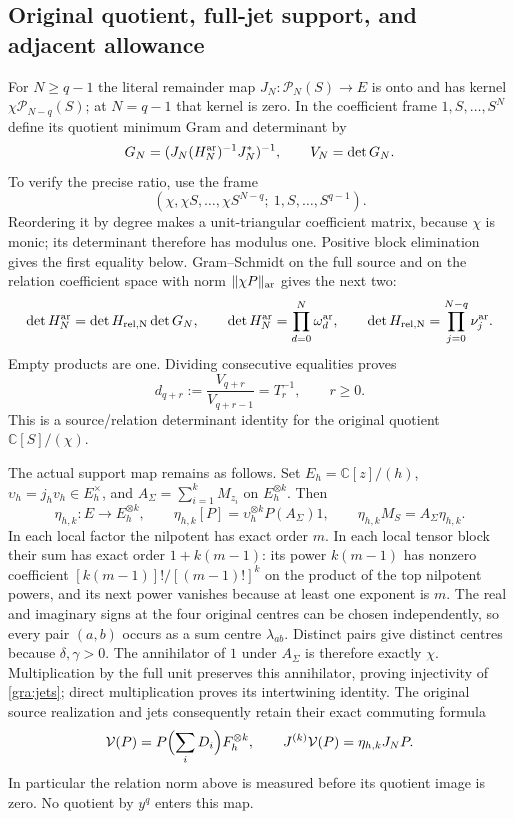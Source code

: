 \documentclass[11pt,a4paper]{article}
\begin{document}
\subsection{Original quotient, full-jet support, and adjacent allowance}

For $N\ge q-1$ the literal remainder map $J_N:\mathcal P_N(S)\to E$
is onto and has kernel $\chi\mathcal P_{N-q}(S)$; at $N=q-1$ that kernel
is zero.  In the coefficient frame $1,S,\ldots,S^N$ define its quotient
minimum Gram and determinant by
\[
 G_N=(J_N(H_N^{\rm ar})^{-1}J_N^*)^{-1},\qquad V_N=\det G_N.
\]
To verify the precise ratio, use the frame
\[
 (\chi,\chi S,\ldots,\chi S^{N-q};\ 1,S,\ldots,S^{q-1}).
\]
Reordering it by degree makes a unit-triangular coefficient matrix,
because $\chi$ is monic; its determinant therefore has modulus one.
Positive block elimination gives the first equality below.
Gram--Schmidt on the full source and on the relation coefficient space
with norm $\|\chi P\|_{\rm ar}$ gives the next two:
\[
 \det H_N^{\rm ar}=\det H_{\rm rel,N}\det G_N,\qquad
 \det H_N^{\rm ar}=\prod_{d=0}^N\omega_d^{\rm ar},\qquad
 \det H_{\rm rel,N}=\prod_{j=0}^{N-q}\nu_j^{\rm ar}.
\]
Empty products are one.  Dividing consecutive equalities proves
\begin{equation}
 d_{q+r}:=\frac{V_{q+r}}{V_{q+r-1}}=T_r^{-1},\qquad r\ge0.
 \tag{GRA12}\label{gra:quotientratio}
\end{equation}
This is a source/relation determinant identity for the original quotient
$\mathbb C[S]/(\chi)$.

The actual support map remains as follows.  Set $E_h=\mathbb C[z]/(h)$,
$\upsilon_h=j_hv_h\in E_h^\times$, and
$A_\Sigma=\sum_{i=1}^kM_{z_i}$ on $E_h^{\otimes k}$.  Then
\begin{equation}
 \eta_{h,k}:E\longrightarrow E_h^{\otimes k},\qquad
 \eta_{h,k}[P]=\upsilon_h^{\otimes k}P(A_\Sigma)1,\qquad
 \eta_{h,k}M_S=A_\Sigma\eta_{h,k}.
 \tag{GRA13}\label{gra:jets}
\end{equation}
In each local factor the nilpotent has exact order $m$.  In each local
tensor block their sum has exact order $1+k(m-1)$: its power $k(m-1)$
has nonzero coefficient $[k(m-1)]!/[(m-1)!]^k$ on the product of the
top nilpotent powers, and its next power vanishes because at least one
exponent is $m$.  The real and imaginary signs at the four original
centres can be chosen independently, so every pair $(a,b)$ occurs as a
sum centre $\lambda_{ab}$.  Distinct pairs give distinct centres because
$\delta,\gamma>0$.  The annihilator of $1$ under $A_\Sigma$ is therefore
exactly $\chi$.  Multiplication by the full unit preserves this
annihilator, proving injectivity of \eqref{gra:jets}; direct multiplication
proves its intertwining identity.  The original source realization and
jets consequently retain their exact commuting formula
\[
 \mathcal V(P)=P\Bigl(\sum_iD_i\Bigr)F_h^{\otimes k},\qquad
 J^{(k)}\mathcal V(P)=\eta_{h,k}J_NP.
\]
In particular the relation norm above is measured before its quotient
image is zero.  No quotient by $y^q$ enters this map.
\end{document}
